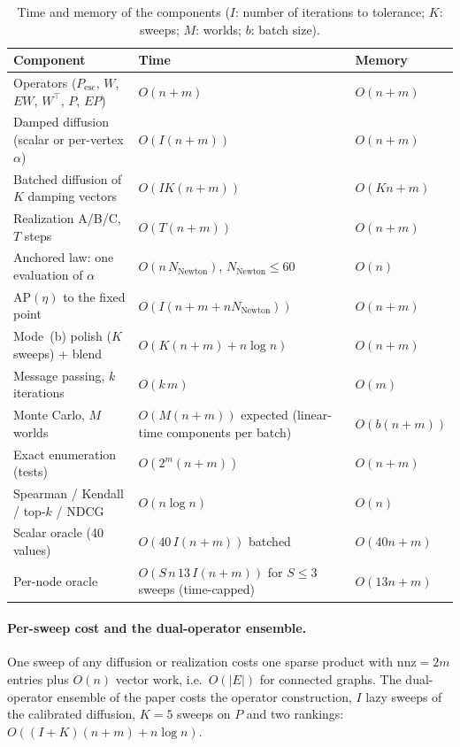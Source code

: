 \documentclass[11pt,a4paper]{article}
\theoremstyle{definition}
\theoremstyle{plain}
\newcommand{\Pesc}{P_{\mathrm{esc}}}
\newcommand{\AP}{\mathrm{AP}}
\begin{document}
\begin{table}[!ht]
\centering
\caption{Time and memory of the components ($I$: number of iterations to tolerance; $K$: sweeps; $M$: worlds; $b$: batch size).}
\label{tab:complexity}
{\footnotesize
\begin{tabular}{>{\raggedright\arraybackslash}p{5.4cm}>{\raggedright\arraybackslash}p{5.2cm}>{\raggedright\arraybackslash}p{4.6cm}}
\toprule
Component & Time & Memory \\
\midrule
Operators ($\Pesc$, $W$, $EW$, $W^{\top}$, $P$, $EP$) & $O(n+m)$ & $O(n+m)$ \\
Damped diffusion (scalar or per-vertex $\alpha$) & $O(I(n+m))$ & $O(n+m)$ \\
Batched diffusion of $K$ damping vectors & $O(IK(n+m))$ & $O(Kn+m)$ \\
Realization A/B/C, $T$ steps & $O(T(n+m))$ & $O(n+m)$ \\
Anchored law: one evaluation of $\alpha$ & $O(n\,N_{\mathrm{Newton}})$, $N_{\mathrm{Newton}}\le60$ & $O(n)$ \\
$\AP(\eta)$ to the fixed point & $O(I(n+m+n N_{\mathrm{Newton}}))$ & $O(n+m)$ \\
Mode~(b) polish ($K$ sweeps) + blend & $O(K(n+m)+n\log n)$ & $O(n+m)$ \\
Message passing, $k$ iterations & $O(k\,m)$ & $O(m)$ \\
Monte Carlo, $M$ worlds & $O(M(n+m))$ expected (linear-time components per batch) & $O(b(n+m))$ \\
Exact enumeration (tests) & $O(2^m(n+m))$ & $O(n+m)$ \\
Spearman / Kendall / top-$k$ / NDCG & $O(n\log n)$ & $O(n)$ \\
Scalar oracle (40 values) & $O(40\,I(n+m))$ batched & $O(40n+m)$ \\
Per-node oracle & $O(S\,n\,13\,I(n+m))$ for $S\le3$ sweeps (time-capped) & $O(13n+m)$ \\
\bottomrule
\end{tabular}}
\end{table}

\paragraph{Per-sweep cost and the dual-operator ensemble.} One sweep of any diffusion or realization costs one sparse product with $\mathrm{nnz}=2m$ entries plus $O(n)$ vector work, i.e.\ $O(|E|)$ for connected graphs. The dual-operator ensemble of the paper costs the operator construction, $I$ lazy sweeps of the calibrated diffusion, $K=5$ sweeps on $P$ and two rankings: $O((I+K)(n+m)+n\log n)$.
\end{document}
